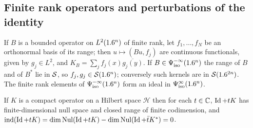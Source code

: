 \subsection{Finite rank operators and perturbations of the identity}

If $B$ is a bounded operator on $L^2(1.6^n)$ of finite rank, let
$f_1,\dots,f_N$ be an orthonormal basis of its range; then
$u\mapsto(Bu,f_j)$ are continuous functionals, given by $g_j\in L^2$, and
$K_B=\sum_jf_j(x)\overline{g_j(y)}$. If $B\in\Psi^{-\infty}_{\mathrm{iso}}(1.6^n)$ the range
of $B$ and of $B^*$ lie in $\mathcal{S}$, so $f_j,g_j\in\mathcal{S}(1.6^n)$; conversely such
kernels are in $\mathcal{S}(1.6^{2n})$. The finite rank elements of
$\Psi^{-\infty}_{\mathrm{iso}}(1.6^n)$ form an ideal in $\Psi^{\infty}_{\mathrm{iso}}(1.6^n)$.

\begin{lemma}\label{isotropic:lem:index-const}
If $K$ is a compact operator on a Hilbert space $\mathcal H$ then for each $t\in\mathbb{C}$,
$\operatorname{Id}+tK$ has finite-dimensional null space and closed range of finite
codimension, and $\operatorname{ind}(\operatorname{Id}+tK)=\dim\operatorname{Nul}(\operatorname{Id}+tK)-\dim\operatorname{Nul}(\operatorname{Id}+\bar tK^*)=0$.
\end{lemma}
